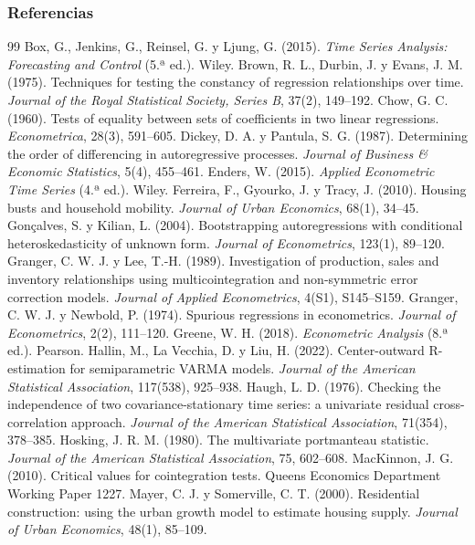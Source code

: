 \documentclass[aspectratio=169]{beamer}
\begin{document}
\begin{frame}[allowframebreaks]
  \frametitle{Referencias}
  \footnotesize
  \begin{thebibliography}{99}
     Box, G., Jenkins, G., Reinsel, G. y Ljung, G. (2015). \emph{Time Series Analysis: Forecasting and Control} (5.ª ed.). Wiley.
     Brown, R. L., Durbin, J. y Evans, J. M. (1975). Techniques for testing the constancy of regression relationships over time. \emph{Journal of the Royal Statistical Society, Series B}, 37(2), 149--192.
     Chow, G. C. (1960). Tests of equality between sets of coefficients in two linear regressions. \emph{Econometrica}, 28(3), 591--605.
     Dickey, D. A. y Pantula, S. G. (1987). Determining the order of differencing in autoregressive processes. \emph{Journal of Business \& Economic Statistics}, 5(4), 455--461.
     Enders, W. (2015). \emph{Applied Econometric Time Series} (4.ª ed.). Wiley.
     Ferreira, F., Gyourko, J. y Tracy, J. (2010). Housing busts and household mobility. \emph{Journal of Urban Economics}, 68(1), 34--45.
     Gonçalves, S. y Kilian, L. (2004). Bootstrapping autoregressions with conditional heteroskedasticity of unknown form. \emph{Journal of Econometrics}, 123(1), 89--120.
     Granger, C. W. J. y Lee, T.-H. (1989). Investigation of production, sales and inventory relationships using multicointegration and non-symmetric error correction models. \emph{Journal of Applied Econometrics}, 4(S1), S145--S159.
     Granger, C. W. J. y Newbold, P. (1974). Spurious regressions in econometrics. \emph{Journal of Econometrics}, 2(2), 111--120.
     Greene, W. H. (2018). \emph{Econometric Analysis} (8.ª ed.). Pearson.
     Hallin, M., La Vecchia, D. y Liu, H. (2022). Center-outward R-estimation for semiparametric VARMA models. \emph{Journal of the American Statistical Association}, 117(538), 925--938.
     Haugh, L. D. (1976). Checking the independence of two covariance-stationary time series: a univariate residual cross-correlation approach. \emph{Journal of the American Statistical Association}, 71(354), 378--385.
     Hosking, J. R. M. (1980). The multivariate portmanteau statistic. \emph{Journal of the American Statistical Association}, 75, 602--608.
     MacKinnon, J. G. (2010). Critical values for cointegration tests. Queen\textquotesingle s Economics Department Working Paper 1227.
     Mayer, C. J. y Somerville, C. T. (2000). Residential construction: using the urban growth model to estimate housing supply. \emph{Journal of Urban Economics}, 48(1), 85--109.

\end{thebibliography}
\end{frame}
\end{document}
